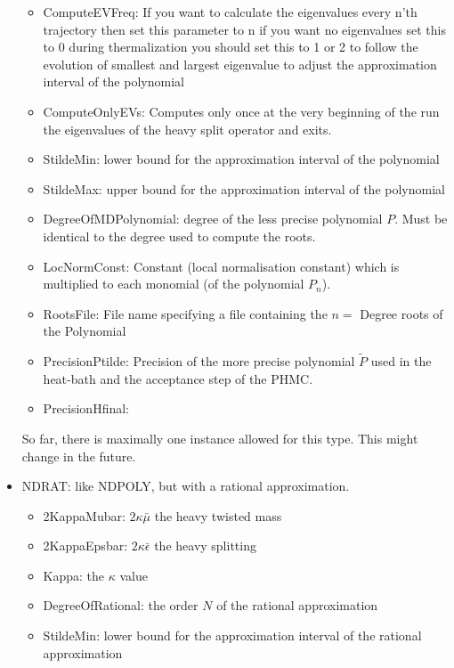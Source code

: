 \begin{itemize}
\begin{itemize}
  \item {\ttfamily ComputeEVFreq}:
    If you want to calculate the eigenvalues every n'th trajectory
    then set this parameter to n if you want no eigenvalues set this to 0
    during thermalization you should set this to 1 or 2 to follow the evolution
    of smallest and largest eigenvalue to adjust the approximation interval
    of the polynomial

  \item {\ttfamily ComputeOnlyEVs}: Computes only once at the very
    beginning of the run the eigenvalues of the heavy split operator
    and exits.

  \item {\ttfamily StildeMin}: lower bound for the approximation interval of the polynomial

  \item {\ttfamily StildeMax}:
    upper bound for the approximation interval of the polynomial

  \item {\ttfamily DegreeOfMDPolynomial}:
    degree of the less precise polynomial $P$. Must be identical to the
    degree used to compute the roots.

  \item {\ttfamily LocNormConst}:
    Constant (local normalisation constant) which is multiplied to each monomial (of the polynomial $P_n$).
  \item {\ttfamily RootsFile}:
    File name specifying a file containing the $n=$ {\ttfamily Degree} roots of the Polynomial

  \item {\ttfamily PrecisionPtilde}:
    Precision of the more precise polynomial $\tilde P$ used in the
    heat-bath and the acceptance step of the PHMC.

  \item {\ttfamily PrecisionHfinal}:
  \end{itemize}
  So far, there is maximally one instance allowed for this type. This
  might change in the future.

\item {\ttfamily NDRAT}: like {\ttfamily NDPOLY}, but with a rational
  approximation. 
  \begin{itemize}
  \item {\ttfamily 2KappaMubar}: $2\kappa\bar\mu$ the heavy twisted mass
  \item {\ttfamily 2KappaEpsbar}: $2\kappa\bar\epsilon$ the heavy
    splitting
  \item {\ttfamily Kappa}: the $\kappa$ value
  \item {\ttfamily DegreeOfRational}: the order $N$ of the rational approximation
  \item {\ttfamily StildeMin}: lower bound for the approximation
    interval of the rational approximation


\end{itemize}
\end{itemize}
